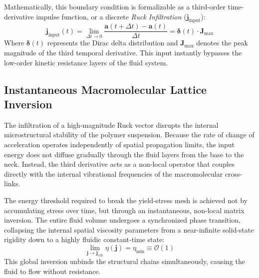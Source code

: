 \documentclass[11pt,a4paper]{article}
\begin{document}
Mathematically, this boundary condition is formalizable as a third-order time-derivative impulse function, or a discrete \textit{Ruck Infiltration} ($\mathbf{j}_{\text{input}}$):
\begin{equation}
    \mathbf{j}_{\text{input}}(t) = \lim_{\Delta t \to 0} \frac{\mathbf{a}(t + \Delta t) - \mathbf{a}(t)}{\Delta t} = \mathbf{\delta}(t) \cdot \mathbf{J}_{\text{max}}
\end{equation}
Where $\mathbf{\delta}(t)$ represents the Dirac delta distribution and $\mathbf{J}_{\text{max}}$ denotes the peak magnitude of the third temporal derivative. This input instantly bypasses the low-order kinetic resistance layers of the fluid system.

\subsection{Instantaneous Macromolecular Lattice Inversion}
The infiltration of a high-magnitude Ruck vector disrupts the internal microstructural stability of the polymer suspension. Because the rate of change of acceleration operates independently of spatial propagation limits, the input energy does not diffuse gradually through the fluid layers from the base to the neck. Instead, the third derivative acts as a non-local operator that couples directly with the internal vibrational frequencies of the macromolecular cross-links.

The energy threshold required to break the yield-stress mesh is achieved not by accumulating stress over time, but through an instantaneous, non-local matrix inversion. The entire fluid volume undergoes a synchronized phase transition, collapsing the internal spatial viscosity parameters from a near-infinite solid-state rigidity down to a highly fluidic constant-time state:
\begin{equation}
    \lim_{\mathbf{j} \to \mathbf{j}_{\text{crit}}} \eta(\mathbf{j}) = \eta_{\text{min}} \equiv \mathcal{O}(1)
\end{equation}
This global inversion unbinds the structural chains simultaneously, causing the fluid to flow without resistance.
\end{document}
